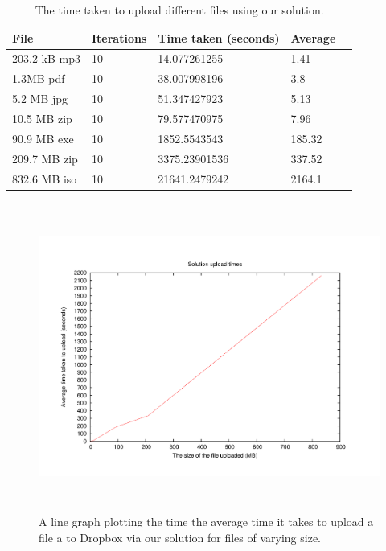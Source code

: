 \documentclass[12pt, titlepage]{article}
\begin{document}
\bigskip
\begin{table}[h!]
\begin{center}
    \begin{tabular}{ | l | l | l | l | l |}
    \hline
    \textbf{File} & \textbf{Iterations} & \textbf{Time taken (seconds)} & \textbf{Average} \\ \hline
    203.2 kB mp3 & 10 & 14.077261255 & 1.41 \\ \hline
    1.3MB pdf & 10 & 38.007998196 & 3.8 \\ \hline 
    5.2 MB jpg & 10 & 51.347427923 & 5.13 \\ \hline
    10.5 MB zip & 10 & 79.577470975 & 7.96  \\ \hline
    90.9 MB exe & 10 & 1852.5543543 & 185.32 \\ \hline
    209.7 MB zip & 10 & 3375.23901536 & 337.52 \\ \hline
    832.6 MB iso & 10 & 21641.2479242 & 2164.1 \\ \hline
    \end{tabular}
    \caption{The time taken to upload different files using our solution.} \label{tab:uploadBenchmark}
    \end{center}
\end{table}

\begin{figure}[!t]
\centerline{\includegraphics[height=4.0in,width=7in,angle=0]{plots/solutionUpload/solutionUploadTimes.pdf}}
\caption{A line graph plotting the time the average time it takes to upload a file a to Dropbox via our solution for files of varying size.}
\label{fig:solutionUploadLineGraph}
\end{figure}
\end{document}
